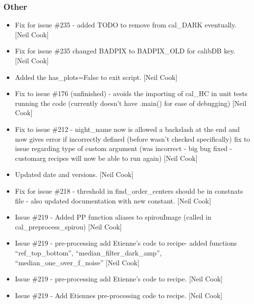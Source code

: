 \documentclass[a4paper,10pt,english]{report}
\begin{document}
\subsubsection{Other}
\label{\detokenize{misc/changelog:other}}\begin{itemize}
\item {} 
Fix for issue \#235 - added TODO to remove from cal\_DARK eventually.
{[}Neil Cook{]}

\item {} 
Fix for issue \#235 changed BADPIX to BADPIX\_OLD for calibDB key. {[}Neil
Cook{]}

\item {} 
Added the has\_plots=False to exit script. {[}Neil Cook{]}

\item {} 
Fix to issue \#176 (unfinished) - avoids the importing of cal\_HC in
unit tests running the code (currently doesn’t have .main() for ease
of debugging) {[}Neil Cook{]}

\item {} 
Fix to issue \#212 - night\_name now is allowed a backslash at the end
and now gives error if incorrectly defined (before wasn’t checked
specifically) fix to issue regarding type of custom argument (was
incorrect - big bug fixed - customarg recipes will now be able to run
again) {[}Neil Cook{]}

\item {} 
Updated date and versions. {[}Neil Cook{]}

\item {} 
Fix for issue \#218 - threshold in find\_order\_centers should be in
constnats file - also updated documentation with new constant. {[}Neil
Cook{]}

\item {} 
Issue \#219 - Added PP function aliases to spirouImage (called in
cal\_preprocess\_spirou) {[}Neil Cook{]}

\item {} 
Issue \#219 - pre-processing add Etienne’s code to recipe- added
functions “ref\_top\_bottom”, “median\_filter\_dark\_amp”,
“median\_one\_over\_f\_noise” {[}Neil Cook{]}

\item {} 
Issue \#219 - pre-processing add Etienne’s code to recipe. {[}Neil Cook{]}

\item {} 
Issue \#219 - Add Etiennes pre-processing code to recipe. {[}Neil Cook{]}

\end{itemize}
\end{document}
